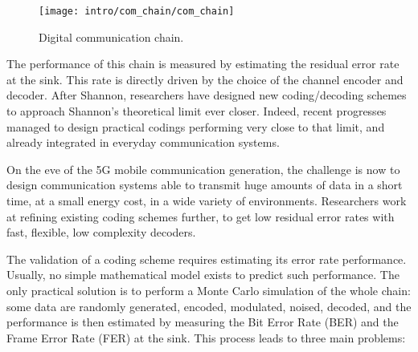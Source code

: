 \begin{figure}[htp]
  \centering
  \texttt{[image: intro/com\_chain/com\_chain]}
  \caption{Digital communication chain.}
  \label{fig:intro_com_chain}
\end{figure}

The performance of this chain is measured by estimating the residual error rate
at the sink. This rate is directly driven by the choice of the channel encoder
and decoder. After Shannon, researchers have designed new coding/decoding
schemes to approach Shannon's theoretical limit ever closer. Indeed, recent
progresses managed to design practical codings performing very close to that
limit, and already integrated in everyday communication systems.

On the eve of the 5G mobile communication generation, the challenge is now to
design communication systems able to transmit huge amounts of data in a short
time, at a small energy cost, in a wide variety of environments. Researchers
work at refining existing coding schemes further, to get low residual error
rates with fast, flexible, low complexity decoders.

The validation of a coding scheme requires estimating its error rate
performance. Usually, no simple mathematical model exists to predict such
performance. The only practical solution is to perform a Monte Carlo simulation
of the whole chain: some data are randomly generated, encoded, modulated,
noised, decoded, and the performance is then estimated by measuring the Bit
Error Rate (BER) and the Frame Error Rate (FER) at the sink. This process leads
to three main problems:

